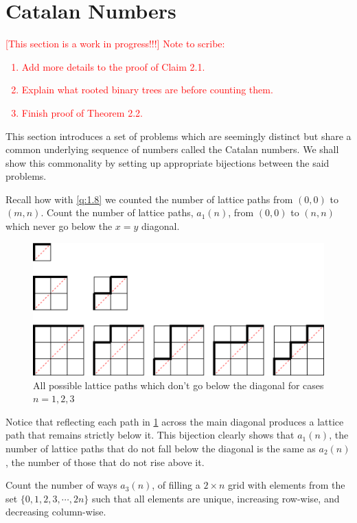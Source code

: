 \section{Catalan Numbers}
\textcolor{red}{
[This section is a work in progress!!!] Note to scribe:
\begin{enumerate}
    \item Add more details to the proof of Claim 2.1.
    \item Explain what rooted binary trees are before counting them.
    \item Finish proof of Theorem 2.2.
\end{enumerate}
}
This section introduces a set of problems which are seemingly distinct but share a common underlying sequence of numbers called the Catalan numbers. We shall show this commonality by setting up appropriate bijections between the said problems. 
\begin{question}
Recall how with \cref{q:1.8} we counted the number of lattice paths from $(0,0)$ to $(m,n)$. Count the number of lattice paths, $a_1(n)$, from $(0,0)$ to $(n,n)$ which never go below the $x=y$ diagonal.
\end{question}
\begin{figure}[H]
    \centering
\includegraphics[width=0.8\linewidth]{Images/Figure11.png}
    \caption{All possible lattice paths which don't go below the diagonal for cases $n=1,2,3$}
    \label{f:3.21}
\end{figure}    
\begin{remark}
Notice that reflecting each path in \cref{f:3.21} across the main diagonal produces a lattice path that remains strictly below it. This bijection clearly shows that $a_1(n)$, the number of lattice paths that do not fall below the diagonal is the same as $a_2(n)$, the number of those that do not rise above it.
\end{remark}
\begin{question}
Count the number of ways $a_3(n)$, of filling a $2\times n$ grid with elements from the set $\{0,1,2,3,\cdots,2n\}$ such that all elements are unique, increasing row-wise, and decreasing column-wise.
\end{question}
